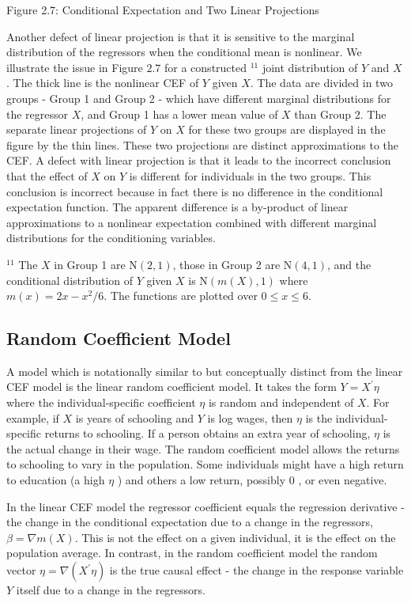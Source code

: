 \documentclass[10pt]{article}
\begin{document}
Figure 2.7: Conditional Expectation and Two Linear Projections

Another defect of linear projection is that it is sensitive to the marginal distribution of the regressors when the conditional mean is nonlinear. We illustrate the issue in Figure $2.7$ for a constructed ${ }^{11}$ joint distribution of $Y$ and $X$. The thick line is the nonlinear CEF of $Y$ given $X$. The data are divided in two groups - Group 1 and Group 2 - which have different marginal distributions for the regressor $X$, and Group 1 has a lower mean value of $X$ than Group 2. The separate linear projections of $Y$ on $X$ for these two groups are displayed in the figure by the thin lines. These two projections are distinct approximations to the CEF. A defect with linear projection is that it leads to the incorrect conclusion that the effect of $X$ on $Y$ is different for individuals in the two groups. This conclusion is incorrect because in fact there is no difference in the conditional expectation function. The apparent difference is a by-product of linear approximations to a nonlinear expectation combined with different marginal distributions for the conditioning variables.

${ }^{11}$ The $X$ in Group 1 are $\mathrm{N}(2,1)$, those in Group 2 are $\mathrm{N}(4,1)$, and the conditional distribution of $Y$ given $X$ is $\mathrm{N}(m(X), 1)$ where $m(x)=2 x-x^{2} / 6$. The functions are plotted over $0 \leq x \leq 6$.

\subsection{Random Coefficient Model}
A model which is notationally similar to but conceptually distinct from the linear CEF model is the linear random coefficient model. It takes the form $Y=X^{\prime} \eta$ where the individual-specific coefficient $\eta$ is random and independent of $X$. For example, if $X$ is years of schooling and $Y$ is log wages, then $\eta$ is the individual-specific returns to schooling. If a person obtains an extra year of schooling, $\eta$ is the actual change in their wage. The random coefficient model allows the returns to schooling to vary in the population. Some individuals might have a high return to education (a high $\eta$ ) and others a low return, possibly 0 , or even negative.

In the linear CEF model the regressor coefficient equals the regression derivative - the change in the conditional expectation due to a change in the regressors, $\beta=\nabla m(X)$. This is not the effect on a given individual, it is the effect on the population average. In contrast, in the random coefficient model the random vector $\eta=\nabla\left(X^{\prime} \eta\right)$ is the true causal effect - the change in the response variable $Y$ itself due to a change in the regressors.
\end{document}
